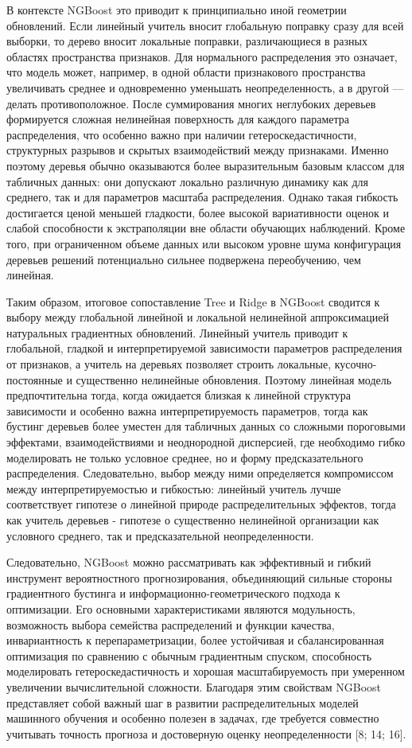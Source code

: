 \documentclass[
]{article}
\begin{document}
В контексте NGBoost это приводит к принципиально иной геометрии обновлений. Если линейный учитель вносит глобальную поправку сразу для всей выборки, то дерево вносит локальные поправки, различающиеся в разных областях пространства признаков. Для нормального распределения это означает, что модель может, например, в одной области признакового пространства увеличивать среднее и одновременно уменьшать неопределенность, а в другой --- делать противоположное. После суммирования многих неглубоких деревьев формируется сложная нелинейная поверхность для каждого параметра распределения, что особенно важно при наличии гетероскедастичности, структурных разрывов и скрытых взаимодействий между признаками. Именно поэтому деревья обычно оказываются более выразительным базовым классом для табличных данных: они допускают локально различную динамику как для среднего, так и для параметров масштаба распределения. Однако такая гибкость достигается ценой меньшей гладкости, более высокой вариативности оценок и слабой способности к экстраполяции вне области обучающих наблюдений. Кроме того, при ограниченном объеме данных или высоком уровне шума конфигурация деревьев решений потенциально сильнее подвержена переобучению, чем линейная.

Таким образом, итоговое сопоставление Tree и Ridge в NGBoost сводится к выбору между глобальной линейной и локальной нелинейной аппроксимацией натуральных градиентных обновлений. Линейный учитель приводит к глобальной, гладкой и интерпретируемой зависимости параметров распределения от признаков, а учитель на деревьях позволяет строить локальные, кусочно-постоянные и существенно нелинейные обновления. Поэтому линейная модель предпочтительна тогда, когда ожидается близкая к линейной структура зависимости и особенно важна интерпретируемость параметров, тогда как бустинг деревьев более уместен для табличных данных со сложными пороговыми эффектами, взаимодействиями и неоднородной дисперсией, где необходимо гибко моделировать не только условное среднее, но и форму предсказательного распределения. Следовательно, выбор между ними определяется компромиссом между интерпретируемостью и гибкостью: линейный учитель лучше соответствует гипотезе о линейной природе распределительных эффектов, тогда как учитель деревьев - гипотезе о существенно нелинейной организации как условного среднего, так и предсказательной неопределенности.

Следовательно, NGBoost можно рассматривать как эффективный и гибкий инструмент вероятностного прогнозирования, объединяющий сильные стороны градиентного бустинга и информационно-геометрического подхода к оптимизации. Его основными характеристиками являются модульность, возможность выбора семейства распределений и функции качества, инвариантность к перепараметризации, более устойчивая и сбалансированная оптимизация по сравнению с обычным градиентным спуском, способность моделировать гетероскедастичность и хорошая масштабируемость при умеренном увеличении вычислительной сложности. Благодаря этим свойствам NGBoost представляет собой важный шаг в развитии распределительных моделей машинного обучения и особенно полезен в задачах, где требуется совместно учитывать точность прогноза и достоверную оценку неопределенности {[}8; 14; 16{]}.
\end{document}
